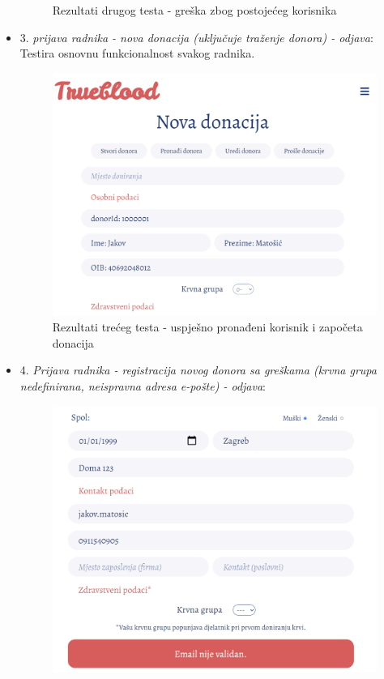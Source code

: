 \begin{itemize}
\begin{figure}[H]
        			\centering
        			\caption{Rezultati drugog testa - greška zbog postojećeg korisnika}
        			\label{fig:controller}
        		\end{figure}
			    \item 3. \textit{prijava radnika - nova donacija (uključuje traženje donora) - odjava}:
			    Testira osnovnu funkcionalnost svakog radnika.
			    \begin{figure}[H]
                    \includegraphics[scale=0.45]{slike/Tests/sistem3.png}
        			\centering
        			\caption{Rezultati trećeg testa - uspješno pronađeni korisnik i započeta donacija}
        			\label{fig:controller}
        		\end{figure}
			    \item 4. \textit{Prijava radnika - registracija novog donora sa greškama (krvna grupa nedefinirana, neispravna adresa e-pošte) - odjava}:
			    \begin{figure}[H]
                    \includegraphics[scale=0.4]{slike/Tests/sistem4.png}

\end{figure}
\end{itemize}
